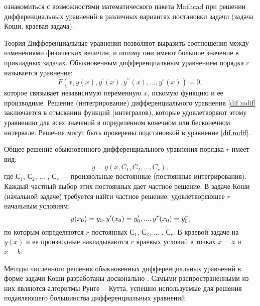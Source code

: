 
\goal ознакомиться с возможностями математического пакета Mathcad при решении дифференциальных уравнений в различных вариантах постановки задачи (задача Коши, краевая задача).

Теория
Дифференциальные уравнения позволяют выразить соотношения между изменениями физических величин, и потому они имеют большое значение в прикладных задачах. Обыкновенным дифференциальным уравнением порядка $r$ называется уравнение:
\begin{equation} \label{dif.mdif}
	F(x,y(x),y^\prime(x),y^{\prime \prime}(x), ... , y^r(x))=0,
\end{equation}
которое связывает независимую переменную $x$, искомую функцию и ее производные. Решение (интегрирование) дифференциального уравнения \ref{dif.mdif} заключается в отыскании функций (интегралов), которые удовлетворяют этому уравнению для всех значений  в определенном конечном  или бесконечном интервале. Решения могут быть проверены подстановкой в уравнение \ref{dif.mdif}.

Общее решение обыкновенного дифференциального уравнения порядка $r$ имеет вид:
\begin{equation}
	y=y(x,C_1,C_2, ... ,C_r),
\end{equation}
где $С_1$, $С_2$, ... , $С_r$ --- произвольные постоянные (постоянные интегрирования). Каждый частный выбор этих постоянных дает частное решение. В задаче Коши (начальной задаче) требуется найти частное решение, удовлетворяющее $r$ начальным условиям:
\begin{equation}
	y(x_0)=y_0, \newline
	y^{\prime}(x_0)=y_0^{\prime}, ... , y^{r}(x_0)=y^r_0,
\end{equation}
по которым определяются $r$ постоянных $С_1$, $С_2$, ... , $С_r$. В краевой задаче на $y(x)$ и ее производные накладываются $r$ краевых условий в точках $x=a$ и $x=b$.

Методы численного решения обыкновенных дифференциальных уравнений в форме задачи Коши разработаны досконально \cite{shipachevvs2005}. Самыми распространенными из них являются алгоритмы Рунге~-- Кутта, успешно используемые для решения подавляющего большинства дифференциальных уравнений. 

